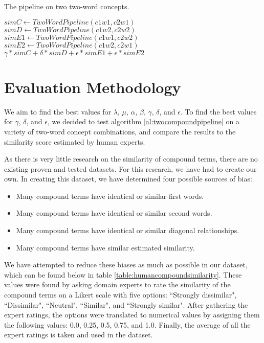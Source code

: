 \documentclass{article}
\begin{document}
\begin{algorithm}
\caption{The pipeline on two two-word concepts.}\label{al:twocompoundpipeline}
\begin{algorithmic}[1]
		\State $\textit{simC} \gets \textit{TwoWordPipeline}(c1w1, c2w1)$
		\State $\textit{simD} \gets \textit{TwoWordPipeline}(c1w2, c2w2)$
		\State $\textit{simE1} \gets \textit{TwoWordPipeline}(c1w1, c2w2)$
		\State $\textit{simE2} \gets \textit{TwoWordPipeline}(c1w2, c2w1)$
		\State \Return $\gamma * \textit{simC} + \delta * \textit{simD} + \epsilon * \textit{simE1} + \epsilon * \textit{simE2}$
	\EndProcedure
\end{algorithmic}
\end{algorithm}

\section{Evaluation Methodology} \label{sec:evalmeth}

We aim to find the best values for $\lambda$, $\mu$, $\alpha$, $\beta$, $\gamma$, $\delta$, and $\epsilon$. To find the best values for $\gamma$, $\delta$, and $\epsilon$, we decided to test algorithm \ref{al:twocompoundpipeline} on a variety of two-word concept combinations, and compare the results to the similarity score estimated by human experts.

As there is very little research on the similarity of compound terms, there are no existing proven and tested datasets. For this research, we have had to create our own. In creating this dataset, we have determined four possible sources of bias:
\begin{itemize}
	\item Many compound terms have identical or similar first words.
	\item Many compound terms have identical or similar second words.
	\item Many compound terms have identical or similar diagonal relationships.
	\item Many compound terms have similar estimated similarity.
\end{itemize}
We have attempted to reduce these biases as much as possible in our dataset, which can be found below in table \ref{table:humancompoundsimilarity}. These values were found by asking domain experts to rate the similarity of the compound terms on a Likert scale with five options: ``Strongly dissimilar", ``Dissimilar", ``Neutral", ``Similar", and ``Strongly similar". After gathering the expert ratings, the options were translated to numerical values by assigning them the following values: 0.0, 0.25, 0.5, 0.75, and 1.0. Finally, the average of all the expert ratings is taken and used in the dataset.
\end{document}
